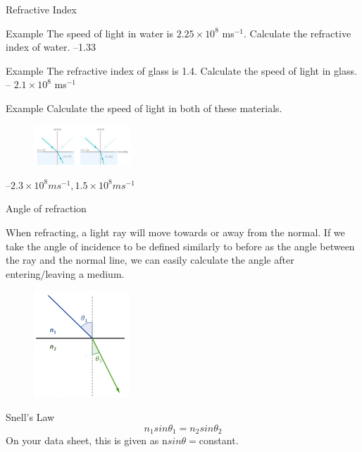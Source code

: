 \documentclass[../Main.tex]{subfiles}
\begin{document}
\begin{frame}{Refractive Index}
\begin{exampleblock}{Example}
The speed of light in water is $2.25 \times 10^8$ ms$^{-1}$. Calculate the refractive index of water. \pause
--1.33
\end{exampleblock} \pause
    \begin{exampleblock}{Example}
    The refractive index of glass is 1.4. Calculate the speed of light in glass. \pause
    \newline -- $2.1\times 10^8$ ms$^{-1}$
    \end{exampleblock}
    \begin{exampleblock}{Example}
    Calculate the speed of light in both of these materials.
    \begin{figure}
        \centering
        \includegraphics[height=1.5cm]{Waves_Images/refractiveindexexample.jpg}
    \end{figure} \pause
    --$2.3\times 10^8 ms^{-1}, 1.5\times 10^8 ms^{-1}$
    \end{exampleblock}
\end{frame}
\begin{frame}{Angle of refraction}
\begin{multicols}{2}
    When refracting, a light ray will move towards or away from the normal. If we take the angle of incidence to be defined similarly to before as the angle between the ray and the normal line, we can easily calculate the angle after entering/leaving a medium. 
    \columnbreak
    \begin{figure}
        \centering
        \includegraphics[height=4cm]{Waves_Images/snellslaw.jpg}
    \end{figure}
    \end{multicols}
    \begin{block}{Snell's Law}
    \begin{equation*}
        n_1 sin\theta_1 = n_2 sin \theta_2
    \end{equation*}
    On your data sheet, this is given as n$sin\theta=$constant.
    \end{block}
  \end{frame}
\end{document}
